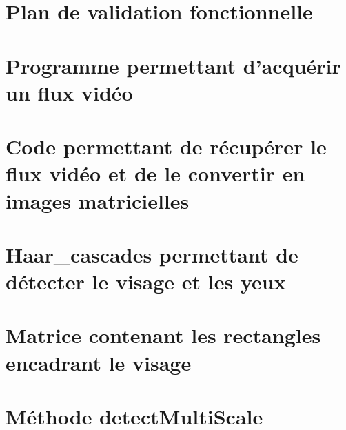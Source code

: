 \documentclass[12pt]{report} %
\begin{document}




%

\newpage
{}



\appendix
\newpage
{}
\chapter{Plan de validation fonctionnelle}
\label{APV}


\chapter{Programme permettant d’acquérir un flux vidéo}
\label{A1}


\chapter{Code permettant de récupérer le flux vidéo et de le convertir en images matricielles}
\label{A2}


\chapter{Haar\_cascades permettant de détecter le visage et les yeux}
\label{A3}


\chapter{Matrice contenant les rectangles encadrant le visage}
\label{A4}


\chapter{Méthode detectMultiScale}
\label{A5}

\end{document}
